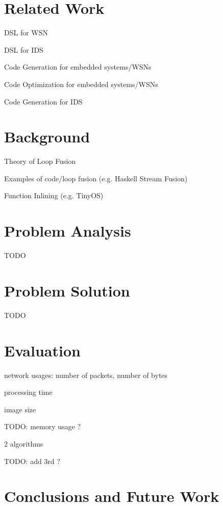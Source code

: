 \documentclass[conference]{IEEEtran}
\begin{document}
\section{Related Work}

DSL for WSN \cite{naumowicz2009prototyping,levis2004tinyscript}

DSL for IDS \cite{eckmann2002statl}

Code Generation for embedded systems/WSNs \cite{leupers2000code,marwedel2002code}

Code Optimization for embedded systems/WSNs \cite{panda2001data,naik2001software}

Code Generation for IDS \cite{charitakis2003code}

\section{Background}

Theory of Loop Fusion \cite{darte2000complexity}

Examples of code/loop fusion (e.g. Haskell Stream Fusion) \cite{coutts2007stream}

Function Inlining (e.g. TinyOS) \cite{gay2007software,gay2003nesc}

\section{Problem Analysis}

TODO

\section{Problem Solution}

TODO

\section{Evaluation}

network usages: number of packets, number of bytes

processing time

image size

TODO: memory usage ?

2 algorithms

TODO: add 3rd ?

\section{Conclusions and Future Work}
\end{document}
